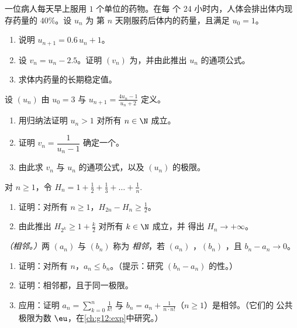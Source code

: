 \begin{exercise}[$\star\star$]\label{exo:g12:seq:7}
一位病人每天早上服用 $1$ 个单位的药物。在每
个 24 小时内，人体会排出体内现存药量的 $40\%$。设 $u_n$ 为
第 $n$ 天刚服药后体内的药量，且满足
$u_0 = 1$。
\begin{enumerate}
  \item 说明 $u_{n+1} = 0.6\,u_n + 1$。
  \item 设 $v_n = u_n - 2.5$。证明 $(v_n)$ 为，并由此推出
        $u_n$ 的通项公式。
  \item 求体内药量的长期稳定值。
\end{enumerate}
\end{exercise}

\begin{exercise}[$\star\star$]\label{exo:g12:seq:8}
设 $(u_n)$ 由 $u_0 = 3$ 与 $u_{n+1} = \frac{4u_n - 1}{u_n + 2}$ 定义。
\begin{enumerate}
  \item 用归纳法证明 $u_n > 1$ 对所有 $n \in \N$ 成立。
  \item 证明 $v_n = \dfrac{1}{u_n - 1}$ 确定一个。
  \item 由此求 $v_n$ 与 $u_n$ 的通项公式，以及
        $(u_n)$ 的极限。
\end{enumerate}
\end{exercise}

\begin{exercise}[$\star\star\star$]\label{exo:g12:seq:9}
对 $n \geq 1$，令
$H_n = 1 + \frac{1}{2} + \frac{1}{3} + \dots + \frac{1}{n}$.
\begin{enumerate}
  \item 证明：对所有 $n \geq 1$，$H_{2n} - H_n \geq \frac{1}{2}$。
  \item 由此推出 $H_{2^k} \geq 1 + \frac{k}{2}$ 对所有 $k \in \N$ 成立，并
        得出 $H_n \to +\infty$。
\end{enumerate}
\end{exercise}

\begin{exercise}[$\star\star\star$]\label{exo:g12:seq:10}
\emph{（相邻。）}两 $(a_n)$ 与 $(b_n)$ 称为
\emph{相邻}，若 $(a_n)$ ，$(b_n)$ ，且
$b_n - a_n \to 0$。
\begin{enumerate}
  \item 证明：对所有 $n$，$a_n \leq b_n$。（提示：研究
        $(b_n - a_n)$ 的性。）
  \item 证明：相邻都，且于同一极限。
  \item 应用：证明
        $a_n = \sum_{k=0}^{n} \frac{1}{k!}$ 与
        $b_n = a_n + \frac{1}{n \cdot n!}$（$n \geq 1$）是相邻。（它们的
        公共极限为数 $\eu$，在\cref{ch:g12:exp}中研究。）
\end{enumerate}
\end{exercise}

